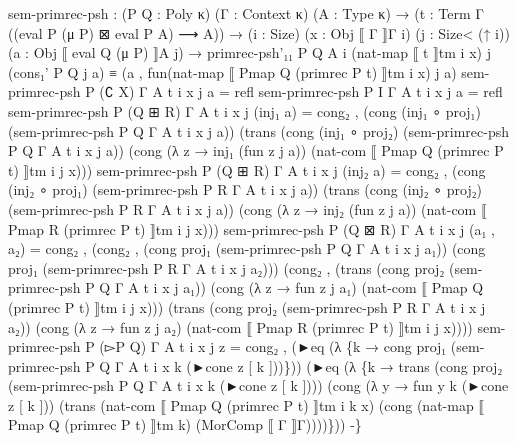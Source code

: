 \begin{code}
{sem{-}primrec{-}psh : (P Q : Poly κ) (Γ : Context κ) (A : Type κ)
  → (t : Term Γ ((eval P (μ P) ⊠ eval P A) ⟶ A))
  → (i : Size) (x : Obj ⟦ Γ ⟧Γ i) (j : Size< (↑ i)) (a : Obj ⟦ eval Q (μ P) ⟧A j)
  → primrec{-}psh'₁₁ P Q A i (nat{-}map ⟦ t ⟧tm i x) j (cons₁' P Q j a) ≡ (a , fun(nat{-}map ⟦ Pmap Q (primrec P t) ⟧tm i x) j a)
sem{-}primrec{-}psh P (∁ X) Γ A t i x j a = refl
sem{-}primrec{-}psh P I Γ A t i x j a = refl
sem{-}primrec{-}psh P (Q ⊞ R) Γ A t i x j (inj₁ a) =
  cong₂ \AgdaUnderscore{},\AgdaUnderscore{} (cong (inj₁ ∘ proj₁) (sem{-}primrec{-}psh P Q Γ A t i x j a))
            (trans (cong (inj₁ ∘ proj₂) (sem{-}primrec{-}psh P Q Γ A t i x j a))
                   (cong (λ z → inj₁ (fun z j a)) (nat{-}com ⟦ Pmap Q (primrec P t) ⟧tm i j x)))
sem{-}primrec{-}psh P (Q ⊞ R) Γ A t i x j (inj₂ a) =
  cong₂ \AgdaUnderscore{},\AgdaUnderscore{} (cong (inj₂ ∘ proj₁) (sem{-}primrec{-}psh P R Γ A t i x j a))
            (trans (cong (inj₂ ∘ proj₂) (sem{-}primrec{-}psh P R Γ A t i x j a))
                   (cong (λ z → inj₂ (fun z j a)) (nat{-}com ⟦ Pmap R (primrec P t) ⟧tm i j x)))
sem{-}primrec{-}psh P (Q ⊠ R) Γ A t i x j (a₁ , a₂) =
  cong₂ \AgdaUnderscore{},\AgdaUnderscore{} (cong₂ \AgdaUnderscore{},\AgdaUnderscore{} (cong proj₁ (sem{-}primrec{-}psh P Q Γ A t i x j a₁))
                       (cong proj₁ (sem{-}primrec{-}psh P R Γ A t i x j a₂)))
            (cong₂ \AgdaUnderscore{},\AgdaUnderscore{} (trans (cong proj₂ (sem{-}primrec{-}psh P Q Γ A t i x j a₁))
                              (cong (λ z → fun z j a₁) (nat{-}com ⟦ Pmap Q (primrec P t) ⟧tm i j x)))
                       (trans (cong proj₂ (sem{-}primrec{-}psh P R Γ A t i x j a₂))
                              (cong (λ z → fun z j a₂) (nat{-}com ⟦ Pmap R (primrec P t) ⟧tm i j x))))
sem{-}primrec{-}psh P (▻P Q) Γ A t i x j z =
  cong₂ \AgdaUnderscore{},\AgdaUnderscore{}
        (►eq (λ \{k → cong proj₁ (sem{-}primrec{-}psh P Q Γ A t i x k (►cone z [ k ]))\}))
        (►eq (λ \{k → trans (cong proj₂ (sem{-}primrec{-}psh P Q Γ A t i x k (►cone z [ k ])))
                           (cong (λ y → fun y k (►cone z [ k ]))
                                 (trans (nat{-}com ⟦ Pmap Q (primrec P t) ⟧tm i k x)
                                        (cong (nat{-}map ⟦ Pmap Q (primrec P t) ⟧tm k) (MorComp ⟦ Γ ⟧Γ))))\}))
{-}\}}\<%
\\
%
\\[\AgdaEmptyExtraSkip]%
\>[0]\AgdaSpace{}%
\AgdaSymbol{:}\AgdaSpace{}%
\AgdaSymbol{(}\AgdaSpace{}%
\AgdaSpace{}%
\AgdaSymbol{:}\AgdaSpace{}%

\end{code}
